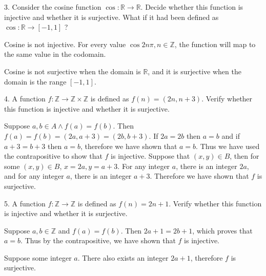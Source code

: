 \documentclass{article}
\begin{document}
\begin{exercise}{}{}
	{3. Consider the cosine function $\cos : \mathbb{R} \rightarrow
			\mathbb{R}$. Decide whether this function is injective and whether it is
		surjective. What if it had been defined as $\cos : \mathbb{R} \rightarrow[-1,1]$
		?}
	\begin{alist}
		\item Cosine is not injective. For every value $\cos 2n\pi, n\in \mathbb{Z}$,
		the function will map to the same value in the codomain.
		\item Cosine is not surjective when the domain is $\mathbb{R}$, and it is
		surjective when the domain is the range $[-1, 1]$.
		\item
	\end{alist}
\end{exercise}{}{}

\begin{exercise}{}{}{4. A function $f: \mathbb{Z} \rightarrow \mathbb{Z} \times
			\mathbb{Z}$ is defined as $f(n)=(2 n, n+3)$. Verify whether this function is
		injective and whether it is surjective.}
	\begin{alist}
		\item Suppose $a, b\in A \land f(a)=f(b)$. Then $f(a)=f(b)=(2a, a+3)=(2b, b+3)$.
		If $2a=2b$ then $a=b$ and if $a+3=b+3$ then $a=b$, therefore we have shown
		that $a=b$. Thus we have used the contrapositive to show that $f$ is
		injective.
		Suppose that $(x, y) \in B$, then for some $(x,y)\in B$, $x=2a, y=a+3$. For any
		integer $a$, there is an integer $2a$, and for any
		integer $a$, there is an integer $a+3$. Therefore we have shown that $f$ is
		surjective.
	\end{alist}
\end{exercise}{}{}

\begin{exercise}{}{}{5. A function $f: \mathbb{Z} \rightarrow \mathbb{Z}$ is
		defined as $f(n)=2 n+1$. Verify whether this function is injective and
		whether it is surjective.}
	\begin{alist}
		\item Suppose $a, b \in \mathbb{Z}$ and $f(a) = f(b)$. Then $2a+1=2b+1$, which
		proves that $a=b$. Thus by the contrapositive, we have shown that $f$ is
		injective.
		\item Suppose some integer $a$.  There also exists an integer $2a+ 1$, therefore
		$f$ is surjective.
	\end{alist}
\end{exercise}{}{}
\end{document}

